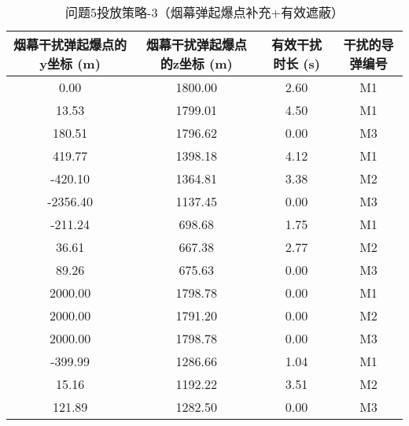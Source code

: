 \documentclass[../main.tex]{subfiles}
\begin{document}
\begin{table}[H]
\caption{问题5投放策略-3（烟幕弹起爆点补充+有效遮蔽）}
\label{tab:032} 
\centering
\begin{small}
\begin{tabular}{cccc}
\toprule[1.5pt]
烟幕干扰弹起爆点的y坐标 (m) & 烟幕干扰弹起爆点的z坐标 (m) & 有效干扰时长 (s) & 干扰的导弹编号 \\
\midrule[1pt]
0.00  & 1800.00 & 2.60 & M1 \\  %
13.53 & 1799.01 & 4.50 & M1 \\  %
180.51& 1796.62 & 0.00 & M3  \\  %
419.77& 1398.18 & 4.12 & M1 \\  %
-420.10&1364.81 & 3.38 & M2 \\  %
-2356.40&1137.45& 0.00 & M3  \\  %
-211.24& 698.68 & 1.75 & M1 \\  %
36.61  & 667.38 & 2.77 & M2 \\  %
89.26  & 675.63 & 0.00 & M3 \\  %
2000.00& 1798.78 & 0.00 & M1  \\  %
2000.00& 1791.20 & 0.00 & M2 \\  %
2000.00& 1798.78 & 0.00 & M3 \\  %
-399.99& 1286.66 & 1.04 & M1 \\  %
15.16  & 1192.22 & 3.51 & M2 \\  %
121.89 & 1282.50 & 0.00 & M3 \\  %
\bottomrule[1.5pt]
\end{tabular}
\end{small}
\end{table}
\end{document}
